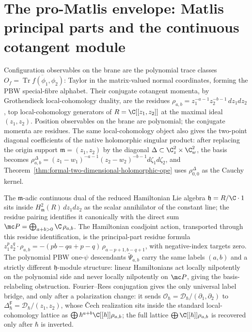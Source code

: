 \section{The pro-Matlis envelope: Matlis principal parts and the continuous cotangent module}\label{sec:pro-matlis-target}\label{sec:app-matlis-principal-parts}

Configuration observables on the brane are the polynomial trace
classes \(O_f=\overline{\operatorname{Tr}f(\phi_1,\phi_2)}\): Taylor
in the matrix-valued normal coordinates, forming the PBW
special-fibre alphabet.  Their conjugate cotangent momenta, by
Grothendieck local-cohomology duality, are the residues
\(\rho_{a,b}=z_1^{-a-1}z_2^{-b-1}\,dz_1dz_2\), top local-cohomology
generators of \(R=\C[[z_1,z_2]]\) at the maximal ideal \((z_1,z_2)\).
Position observables on the brane are polynomial; the conjugate
momenta are residues.  The same local-cohomology object also gives the
two-point diagonal coefficients of the native holomorphic singular
product: after replacing
the origin support \(\mathfrak m=(z_1,z_2)\) by the diagonal
\(\Delta\subset\C^2_z\times\C^2_w\), the basis becomes
\(\rho^\Delta_{a,b}=(z_1-w_1)^{-a-1}(z_2-w_2)^{-b-1}d\zeta_1d\zeta_2\),
and Theorem~\ref{thm:formal-two-dimensional-holomorphic-ope} uses
\(\rho^\Delta_{0,0}\) as the Cauchy kernel.

The \(\mathfrak m\)-adic continuous dual of the reduced Hamiltonian Lie
algebra \(\mathfrak h=R/\C\cdot1\) sits inside
\(H^2_{\mathfrak m}(R)\,dz_1dz_2\) as the scalar annihilator of the
constant line; the residue pairing identifies it canonically with the
direct sum \(\mc P=\bigoplus_{a+b>0}\C\,\rho_{a,b}\).  The Hamiltonian
coadjoint action, transported through this residue identification, is
the principal-part residue formula
\(z_1^p z_2^q\cdot\rho_{a,b}=-(pb-qa+p-q)\,\rho_{a-p+1,b-q+1}\), with
negative-index targets zero.  The polynomial PBW one-\(\psi\)
descendants \(\widetilde\Psi_{a,b}\) carry the same labels \((a,b)\) and
a strictly different \(\mathfrak h\)-module structure: linear
Hamiltonians act locally nilpotently on the polynomial side and never
locally nilpotently on \(\mc P\), giving the basis-relabeling
obstruction.  Fourier--Rees conjugation gives the only universal
label bridge, and only after a polarization change: it sends
\(\mathcal O_\hbar=\mathcal D_\hbar/(\partial_1,\partial_2)\) to
\(\Delta^{\mathsf F}_\hbar=\mathcal D_\hbar/(z_1,z_2)\), whose \v{C}ech
realization sits inside the standard local-cohomology lattice as
\(\bigoplus\hbar^{a+b}\C[[\hbar]]\rho_{a,b}\); the full lattice
\(\bigoplus\C[[\hbar]]\rho_{a,b}\) is recovered only after \(\hbar\) is
inverted.

